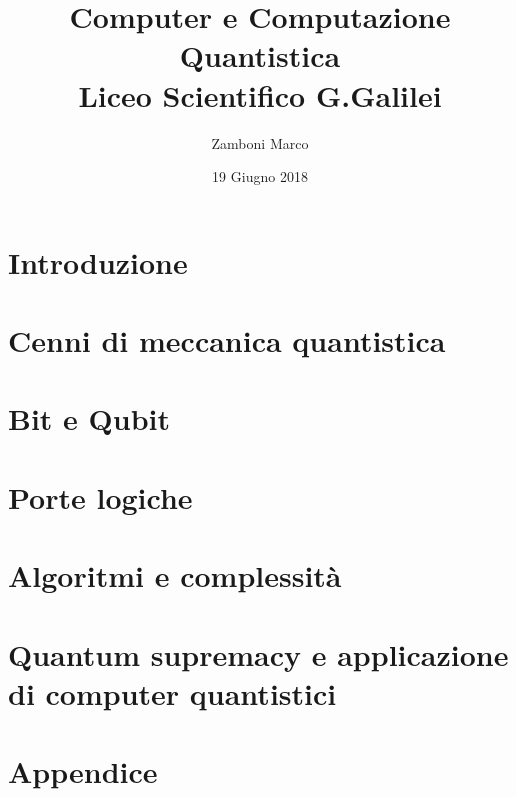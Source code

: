 \documentclass[10pt]{report}
\author{Zamboni Marco}
\date{19 Giugno 2018}
\title{{Computer e Computazione Quantistica}\\
		{\large Liceo Scientifico G.Galilei}}
\begin{document}

\tableofcontents
\chapter{Introduzione}

\chapter{Cenni di meccanica quantistica}

\chapter{Bit e Qubit}

\chapter{Porte logiche}

\chapter{Algoritmi e complessità}

\chapter{Quantum supremacy e applicazione di computer quantistici}

\appendix
\chapter{Appendice}

\end{document}
